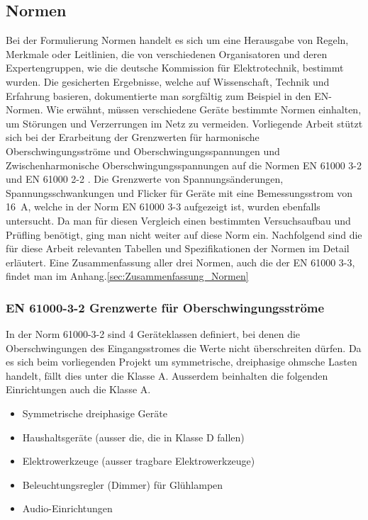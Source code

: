 \subsection{Normen}\label{sec:Normen}
Bei der Formulierung \grqq Normen\grqq \hspace{0.02cm} handelt es sich um eine Herausgabe von Regeln, Merkmale oder Leitlinien, die von verschiedenen Organisatoren und deren Expertengruppen, wie die deutsche Kommission für Elektrotechnik, bestimmt wurden. Die gesicherten Ergebnisse, welche auf Wissenschaft, Technik und Erfahrung basieren, dokumentierte man sorgfältig zum Beispiel in den EN-Normen. Wie erwähnt, müssen verschiedene Geräte bestimmte Normen einhalten, um Störungen und Verzerrungen im Netz zu vermeiden. Vorliegende Arbeit stützt sich bei der Erarbeitung der Grenzwerten für harmonische Oberschwingungsströme und Oberschwingungsspannungen und Zwischenharmonische Oberschwingungsspannungen auf die Normen EN 61000 3-2 \cite{EMVNorm} und EN 61000 2-2 \cite{SpannungsNorm}. Die Grenzwerte von Spannungsänderungen, Spannungsschwankungen und Flicker für Geräte mit eine Bemessungsstrom von \SI{16}{A}, welche in der Norm EN 61000 3-3 \cite{FlickerNorm} aufgezeigt ist, wurden ebenfalls untersucht. Da man für diesen Vergleich einen bestimmten Versuchsaufbau und Prüfling benötigt, ging man nicht weiter auf diese Norm ein. Nachfolgend sind die für diese Arbeit relevanten Tabellen und Spezifikationen der Normen im Detail erläutert. Eine Zusammenfassung aller drei Normen, auch die der EN 61000 3-3, findet man im Anhang.\ref{sec:Zusammenfassung_Normen} 

\subsubsection{EN 61000-3-2 Grenzwerte für Oberschwingungsströme}\label{sec:Stromnormen}

In der Norm 61000-3-2 sind 4 Geräteklassen definiert, bei denen die Oberschwingungen des Eingangsstromes die Werte nicht überschreiten dürfen. Da es sich beim vorliegenden Projekt um symmetrische, dreiphasige ohmsche Lasten handelt, fällt dies unter die Klasse A. Ausserdem beinhalten die folgenden Einrichtungen auch die Klasse A. 
\begin{itemize}
\item Symmetrische dreiphasige Geräte	
\item Haushaltsgeräte (ausser die, die in Klasse D fallen)
\item Elektrowerkzeuge (ausser tragbare Elektrowerkzeuge)
\item Beleuchtungsregler (Dimmer) für Glühlampen
\item Audio-Einrichtungen
\end{itemize} 

